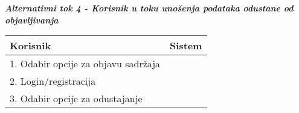 \documentclass[12pt, a4paper]{report}
\begin{document}
\begin{flushleft}
\textbf{\textit{Alternativni tok 4 - Korisnik u toku unošenja podataka odustane od objavljivanja}} \\
\begin{tabular}{|m{7cm}|m{7cm}|}
\hline
\textbf{Korisnik} & \textbf{Sistem} \\
\hline
1. Odabir opcije za objavu sadržaja &  \\
\hline
2. Login/registracija &  \\
\hline
3. Odabir opcije za odustajanje &  \\
\hline
\end{tabular}


\end{flushleft}
\end{document}
